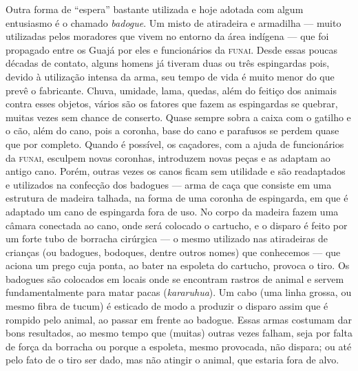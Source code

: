 Outra forma de ``espera'' bastante utilizada e hoje adotada com algum
entusiasmo é o chamado \emph{badogue}. Um misto de atiradeira e
armadilha --- muito utilizadas pelos moradores que vivem no entorno da
área indígena --- que foi propagado entre os Guajá por eles e funcionários
da \textsc{funai}. Desde essas poucas décadas de contato, alguns homens já
tiveram duas ou três espingardas pois, devido à utilização intensa da
arma, seu tempo de vida é muito menor do que prevê o fabricante. Chuva,
umidade, lama, quedas, além do feitiço dos animais contra esses objetos,
vários são os fatores que fazem as espingardas se quebrar, muitas vezes
sem chance de conserto. Quase sempre sobra a caixa com o gatilho e o
cão, além do cano, pois a coronha, base do cano e parafusos se perdem
quase que por completo. Quando é possível, os caçadores, com a ajuda de
funcionários da \textsc{funai}, esculpem novas coronhas, introduzem novas peças e
as adaptam ao antigo cano. Porém, outras vezes os canos ficam sem
utilidade e são readaptados e utilizados na confecção dos badogues ---
arma de caça que consiste em uma estrutura de madeira talhada, na forma
de uma coronha de espingarda, em que é adaptado um cano de espingarda
fora de uso. No corpo da madeira fazem uma câmara conectada ao cano,
onde será colocado o cartucho, e o disparo é feito por um forte tubo de
borracha cirúrgica --- o mesmo utilizado nas atiradeiras de crianças (ou
badogues, bodoques, dentre outros nomes) que conhecemos --- que aciona um
prego cuja ponta, ao bater na espoleta do cartucho, provoca o tiro. Os
badogues são colocados em locais onde se encontram rastros de animal e
servem fundamentalmente para matar pacas (\emph{kararuhua}). Um cabo
(uma linha grossa, ou mesmo fibra de tucum) é esticado de modo a
produzir o disparo assim que é rompido pelo animal, ao passar em frente
ao badogue. Essas armas costumam dar bons resultados, ao mesmo tempo que
(muitas) outras vezes falham, seja por falta de força da borracha ou
porque a espoleta, mesmo provocada, não dispara; ou até pelo fato de o
tiro ser dado, mas não atingir o animal, que estaria fora de alvo.

